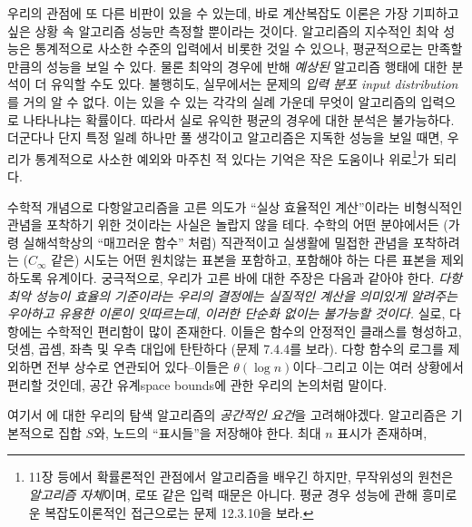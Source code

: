 \documentclass[a4paper,chapter,atbegshi,]{oblivoir}
\begin{document}
우리의 관점에 또 다른 비판이 있을 수 있는데, 바로 계산복잡도 이론은 
가장 기피하고 싶은 상황 속 알고리즘 성능만 측정할 뿐이라는 것이다.
알고리즘의 지수적인 최악 성능은 통계적으로 사소한 수준의 입력에서 
비롯한 것일 수 있으나, 평균적으로는 만족할 만큼의 성능을 보일 수 있다. 
물론 최악의 경우에 반해 \emph{예상된} 알고리즘 행태에 대한 분석이
더 유익할 수도 있다. 불행히도, 실무에서는 문제의 \emph{입력 분포\footnotesize
input distribution}를 거의 알 수 없다. 이는 있을 수 있는 각각의 실례
가운데 무엇이 알고리즘의 입력으로 나타나냐는 확률이다. 따라서
실로 유익한 평균의 경우에 대한 분석은 불가능하다. 더군다나 단지 특정 일례
하나만 풀 생각이고 알고리즘은 지독한 성능을 보일 때면, 우리가 통계적으로
사소한 예외와 마주친 적 있다는 기억은 작은 도움이나 위로\footnote[3]{11장
등에서 확률론적인 관점에서 알고리즘을 배우긴 하지만, 무작위성의 원천은
\emph{알고리즘 자체}이며, 로또 같은 입력 때문은 아니다. 평균 경우 성능에 
관해 흥미로운 복잡도이론적인 접근으로는 문제 12.3.10을 보라.}가 되리다. 

수학적 개념으로 다항알고리즘을 고른 의도가 ``실상 효율적인 계산''이라는
비형식적인 관념을 포착하기 위한 것이라는 사실은 놀랍지 않을 테다. 
수학의 어떤 분야에서든 (가령 실해석학상의 ``매끄러운 함수'' 처럼) 직관적이고
실생활에 밀접한 관념을 포착하려는 ($C_{\infty}$ 같은) 시도는 어떤
원치않는 표본을 포함하고, 포함해야 하는 다른 표본을 제외하도록 유계이다.
궁극적으로, 우리가 고른 바에 대한 주장은 다음과 같아야 한다.
\emph{다항 최악 성능이 효율의 기준이라는 우리의 결정에는 실질적인 계산을
의미있게 알려주는 우아하고 유용한 이론이 잇따르는데, 이러한 단순화
없이는 불가능할 것이다.} 실로, 다항에는 수학적인 편리함이 많이 존재한다.
이들은 함수의 안정적인 클래스를 형성하고, 덧셈, 곱셈, 좌측 및 우측 대입에
탄탄하다 (문제 7.4.4를 보라).
다항 함수의 로그를 제외하면 전부 상수로 연관되어 있다--이들은 
$\theta(\log n)$이다--그리고 이는 여러 상황에서 편리할 것인데, 공간 유계{\footnotesize space bounds}에 관한 우리의 논의처럼 말이다. 

여기서 에 대한 우리의 탐색 알고리즘의 \emph{공간적인 요건}을
고려해야겠다. 알고리즘은 기본적으로 집합 $S$와, 노드의 ``표시들''을 저장해야
한다. 최대 $n$ 표시가 존재하며,
\end{document}
